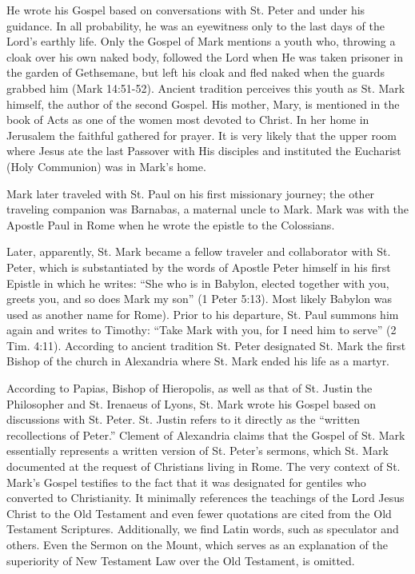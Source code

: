 He wrote his Gospel based on conversations with St. Peter and under his guidance. In all probability, he was an eyewitness only to the last days of the Lord's earthly life. Only the Gospel of Mark mentions a youth who, throwing a cloak over his own naked body, followed the Lord when He was taken prisoner in the garden of Gethsemane, but left his cloak and fled naked when the guards grabbed him (Mark 14:51-52). Ancient tradition perceives this youth as St. Mark himself, the author of the second Gospel. His mother, Mary, is mentioned in the book of Acts as one of the women most devoted to Christ. In her home in Jerusalem the faithful gathered for prayer. It is very likely that the upper room where Jesus ate the last Passover with His disciples and instituted the Eucharist (Holy Communion) was in Mark's home.

Mark later traveled with St. Paul on his first missionary journey; the other traveling companion was Barnabas, a maternal uncle to Mark. Mark was with the Apostle Paul in Rome when he wrote the epistle to the Colossians.

Later, apparently, St. Mark became a fellow traveler and collaborator with St. Peter, which is substantiated by the words of Apostle Peter himself in his first Epistle in which he writes: ``She who is in Babylon, elected together with you, greets you, and so does Mark my son'' (1 Peter 5:13). Most likely Babylon was used as another name for Rome). Prior to his departure, St. Paul summons him again and writes to Timothy: ``Take Mark with you, for I need him to serve'' (2 Tim. 4:11). According to ancient tradition St. Peter designated St. Mark the first Bishop of the church in Alexandria where St. Mark ended his life as a martyr.

According to Papias, Bishop of Hieropolis, as well as that of St. Justin the Philosopher and St. Irenaeus of Lyons, St. Mark wrote his Gospel based on discussions with St. Peter. St. Justin refers to it directly as the ``written recollections of Peter.'' Clement of Alexandria claims that the Gospel of St. Mark essentially represents a written version of St. Peter's sermons, which St. Mark documented at the request of Christians living in Rome. The very context of St. Mark's Gospel testifies to the fact that it was designated for gentiles who converted to Christianity. It minimally references the teachings of the Lord Jesus Christ to the Old Testament and even fewer quotations are cited from the Old Testament Scriptures. Additionally, we find Latin words, such as speculator and others. Even the Sermon on the Mount, which serves as an explanation of the superiority of New Testament Law over the Old Testament, is omitted.

